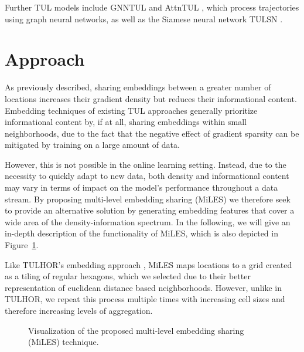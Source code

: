 \documentclass{article} %
\theoremstyle{definition}
\begin{document}
Further TUL models include GNNTUL \citep{zhouTrajectoryUserLinkingGraph2021a} and AttnTUL \citep{chenTrajectoryUserLinkingHierarchical2024}, which process trajectories using graph neural networks, as well as the Siamese neural network TULSN \citep{yuTULSNSiameseNetwork2020a}.



\section{Approach}

As previously described, sharing embeddings between a greater number of locations increases their gradient density but reduces their informational content.
Embedding techniques of existing TUL approaches generally prioritize informational content by, if at all, sharing embeddings within small neighborhoods, due to the fact that the negative effect of gradient sparsity can be mitigated by training on a large amount of data.

However, this is not possible in the online learning setting.
Instead, due to the necessity to quickly adapt to new data, both density and informational content may vary in terms of impact on the model's performance throughout a data stream.
By proposing multi-level embedding sharing (MiLES) we therefore seek to provide an alternative solution by generating embedding features that cover a wide area of the density-information spectrum.
In the following, we will give an in-depth description of the functionality of MiLES, which is also depicted in Figure~\ref{fig:approach}.


Like TULHOR's embedding approach \citep{alsaeedTrajectoryUserLinkingUsing2023a}, MiLES maps locations to a grid created as a tiling of regular hexagons, which we selected due to their better representation of euclidean distance based neighborhoods.
However, unlike in TULHOR, we repeat this process multiple times with increasing cell sizes and therefore increasing levels of aggregation.

\begin{figure}[ht]
    \centering
    \resizebox{\textwidth}{!}{
        
    }
    \caption{Visualization of the proposed multi-level embedding sharing (MiLES) technique.}
    \label{fig:approach}
\end{figure}
\end{document}
